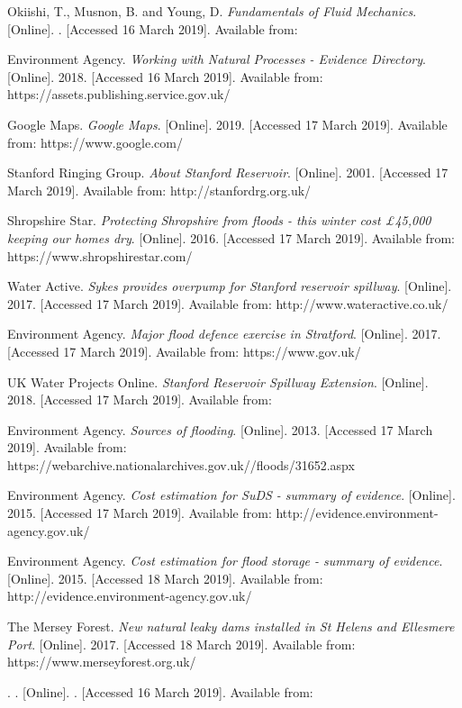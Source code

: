 \documentclass[11pt,a4paper]{article}
\begin{document}
\begin{thebibliography}{}
Okiishi, T., Musnon, B. and Young, D. \textit{Fundamentals of Fluid Mechanics}. [Online]. . [Accessed 16 March 2019]. Available from: 

Environment Agency. \textit{Working with Natural Processes - Evidence Directory}. [Online]. 2018. [Accessed 16 March 2019]. Available from: https://assets.publishing.service.gov.uk/

Google Maps. \textit{Google Maps}. [Online]. 2019. [Accessed 17 March 2019]. Available from: https://www.google.com/

Stanford Ringing Group. \textit{About Stanford Reservoir}. [Online]. 2001. [Accessed 17 March 2019]. Available from: http://stanfordrg.org.uk/

Shropshire Star. \textit{Protecting Shropshire from floods - this winter cost £45,000 keeping our homes dry}. [Online]. 2016. [Accessed 17 March 2019]. Available from: https://www.shropshirestar.com/

Water Active. \textit{Sykes provides overpump for Stanford reservoir spillway}. [Online]. 2017. [Accessed 17 March 2019]. Available from: http://www.wateractive.co.uk/

Environment Agency. \textit{Major flood defence exercise in Stratford}. [Online]. 2017. [Accessed 17 March 2019]. Available from: https://www.gov.uk/

UK Water Projects Online. \textit{Stanford Reservoir Spillway Extension}. [Online]. 2018. [Accessed 17 March 2019]. Available from:

Environment Agency. \textit{Sources of flooding}. [Online]. 2013. [Accessed 17 March 2019]. Available from: https://webarchive.nationalarchives.gov.uk//floods/31652.aspx

Environment Agency. \textit{Cost estimation for SuDS - summary of evidence}. [Online]. 2015. [Accessed 17 March 2019]. Available from: http://evidence.environment-agency.gov.uk/

Environment Agency. \textit{Cost estimation for flood storage - summary of evidence}. [Online]. 2015. [Accessed 18 March 2019]. Available from: http://evidence.environment-agency.gov.uk/

The Mersey Forest. \textit{New natural leaky dams installed in St Helens and Ellesmere Port}. [Online]. 2017. [Accessed 18 March 2019]. Available from: https://www.merseyforest.org.uk/

\bibitem{}
. \textit{}. [Online]. . [Accessed 16 March 2019]. Available from:
\end{thebibliography}
\end{document}
